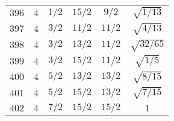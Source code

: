 \begin{table}
\begin{center}
\begin{tabular}{|c|c|c|c|c|c|}
$396$ & $4$ & $1/2$ & $15/2$ & $9/2$ & $\sqrt{1/13}$ \\ 
$397$ & $4$ & $3/2$ & $11/2$ & $11/2$ & $\sqrt{4/13}$ \\ 
$398$ & $4$ & $3/2$ & $13/2$ & $11/2$ & $\sqrt{32/65}$ \\ 
$399$ & $4$ & $3/2$ & $15/2$ & $11/2$ & $\sqrt{1/5}$ \\ 
$400$ & $4$ & $5/2$ & $13/2$ & $13/2$ & $\sqrt{8/15}$ \\ 
$401$ & $4$ & $5/2$ & $15/2$ & $13/2$ & $\sqrt{7/15}$ \\ 
$402$ & $4$ & $7/2$ & $15/2$ & $15/2$ & $1$ \\ 
\hline 
\end{tabular}
\end{center}
\end{table}


